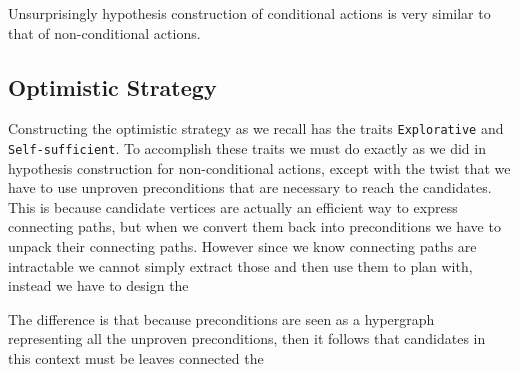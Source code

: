 \documentclass[../Master.tex]{subfiles}
\providecommand{\master}{..}
\begin{document}
Unsurprisingly hypothesis construction of conditional actions is very similar to that of non-conditional actions. 


\subsection{Optimistic Strategy}
Constructing the optimistic strategy as we recall has the traits \texttt{Explorative} and \texttt{Self-sufficient}.
To accomplish these traits we must do exactly as we did in hypothesis construction for non-conditional actions, 
except with the twist that we have to use unproven preconditions that are necessary to reach the candidates.
This is because candidate vertices are actually an efficient way to express connecting paths, 
but when we convert them back into preconditions we have to unpack their connecting paths.
However since we know connecting paths are intractable we cannot simply extract those and then use them to plan with, instead we have to design the  


The difference is that because preconditions are seen as a hypergraph representing all the unproven preconditions, 
then it follows that candidates in this context must be leaves connected the  

  

  
\end{document}
